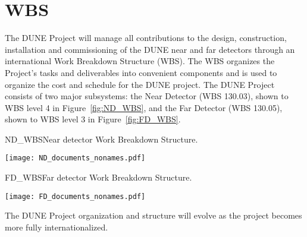 \section[Work Breakdown Structure (WBS)]{WBS}

The DUNE Project will manage all contributions to the design,
construction, installation and commissioning of the DUNE near and far
detectors through an international Work Breakdown Structure (WBS).
The WBS organizes the Project's tasks and deliverables into convenient
components and is used to organize the cost and schedule for the DUNE
project. The DUNE Project consists of two major subsystems: the Near Detector
(WBS 130.03), shown to WBS level 4 in Figure~\ref{fig:ND_WBS}, and the
Far Detector (WBS 130.05), shown to WBS level 3 in
Figure~\ref{fig:FD_WBS}.
\begin{cdrfigure}{ND_WBS}{Near detector Work Breakdown Structure.}
\centering
\begin{center}
\texttt{[image: ND\_documents\_nonames.pdf]}
\end{center}
\end{cdrfigure}
\begin{cdrfigure}{FD_WBS}{Far detector Work Breakdown Structure.}
\centering
\begin{center}
\texttt{[image: FD\_documents\_nonames.pdf]}
\end{center}
\end{cdrfigure}
The DUNE Project organization and structure will evolve as the project
becomes more fully internationalized.
